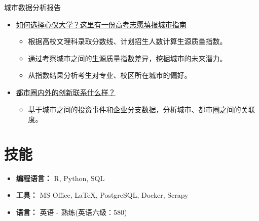 \documentclass{resume}
\begin{document}
城市数据分析报告
\begin{itemize}
  \item {\href{https://mp.weixin.qq.com/s/SyOUXpGp4fwp5L7ENjbohw}{如何选择心仪大学？这里有一份高考志愿填报城市指南}}
    \begin{itemize}
      \item 根据高校文理科录取分数线、计划招生人数计算生源质量指数。
      \item 通过考察城市之间的生源质量指数差异，挖掘城市的未来潜力。
      \item 从指数结果分析考生对专业、校区所在城市的偏好。
    \end{itemize}
  \item {\href{https://mp.weixin.qq.com/s/E5gDIfpdBE4sHfa7M52udA}{都市圈内外的创新联系什么样？}}
    \begin{itemize}
      \item 基于城市之间的投资事件和企业分支数据，分析城市、都市圈之间的关联度。
    \end{itemize} 
\end{itemize}




\section{技能}
\begin{itemize}
  \item \textbf{编程语言：} \small R, Python, SQL
  \item \textbf{工具：} \small MS Office, \LaTeX, PostgreSQL, Docker, Scrapy
  \item \textbf{语言：} \small 英语 - 熟练(英语六级：580)
\end{itemize}
\end{document}
